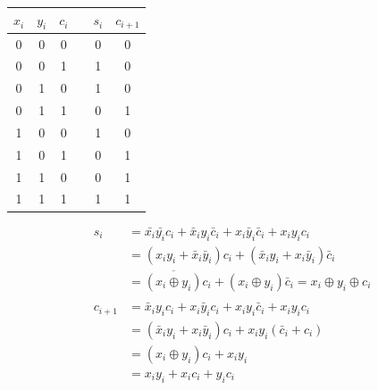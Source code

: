 \documentclass[12pt,openany]{book}
\newcommand*\xor{\oplus}
\begin{document}
			      	
			      		      
							  \begin{minipage}{0.45\textwidth}
								\begin{center}
								      		      	\begin{tabular}{cccc|cc}
								      		      		\( x_i \) & \( y_i \) & \( c_i \) &   & \( s_i \) & \( c_{i+1} \) \\
								      		      		\hline
								      		      		0         & 0         & 0         &   & 0         & 0             \\
								      		      		0         & 0         & 1         &   & 1         & 0             \\
								      		      		0         & 1         & 0         &   & 1         & 0             \\
								      		      		0         & 1         & 1         &   & 0         & 1             \\
								      		      		1         & 0         & 0         &   & 1         & 0             \\
								      		      		1         & 0         & 1         &   & 0         & 1             \\
								      		      		1         & 1         & 0         &   & 0         & 1             \\
								      		      		1         & 1         & 1         &   & 1         & 1             \\
								      		      	\end{tabular}
								\end{center}
	
							  \end{minipage}
							  \hfill
							  \vline
							  \hfill
							  \begin{minipage}{0.45\textwidth}
								\begin{align*}
								s_i     & = \bar{x_i}\bar{y_i} c_i + \bar{x}_i y_i \bar{c}_i + x_i \bar{y}_i \bar{c}_i + x_i y_i c_i \\
										& = (x_i y_i + \bar{x}_i \bar{y}_i)c_i + (\bar{x}_i y_i + x_i \bar{y}_i)\bar{c}_i            \\
										& = \overline{(x_i \xor y_i)}c_i + (x_i \xor y_i)\bar{c}_i = x_i \xor y_i \xor c_i           \\
								\\
								c_{i+1} & = \bar{x}_i y_i c_i + x_i \bar{y}_i c_i + x_i y_i \bar{c}_i + x_i y_i c_i                  \\
										& = (\bar{x}_i y_i + x_i \bar{y}_i)c_i + x_i y_i(\bar{c}_i + c_i)                            \\
										& = (x_i \xor y_i)c_i + x_i y_i                                                              \\
										& = x_i y_i + x_i c_i + y_i c_i                                                              \\
								\end{align*}
							  \end{minipage}
\end{document}
